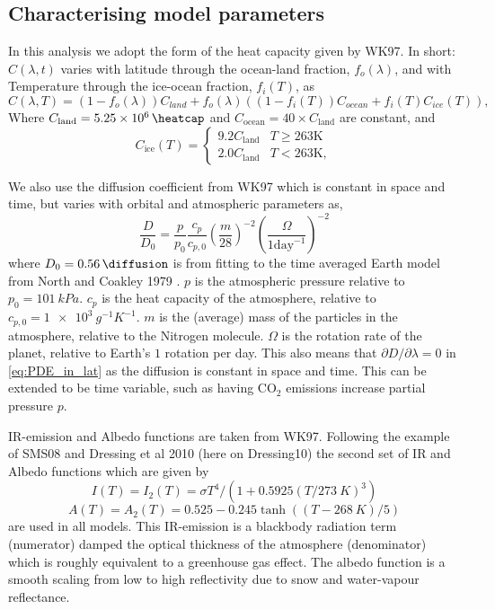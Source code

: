 \documentclass[12pt, onecolumn]{revtex4-2}    %
\begin{document}
\subsection{Characterising model parameters} \label{sec:model_params}

In this analysis we adopt the form of the heat capacity given by WK97.
In short: $C(\lambda, t)$ varies with latitude through the ocean-land fraction, $f_o(\lambda)$, and with Temperature through the ice-ocean fraction, $f_i(T)$, as
$$
    C(\lambda, T) = (1 - f_o(\lambda)) C_{land} + f_o(\lambda) ((1-f_i(T)) C_{ocean} + f_i(T) C_{ice}(T)),
$$
Where $C_{\text{land}} = \qty{5.25e6}{\heatcap}$ and $C_{\text{ocean}} = 40 \times C_{\text{land}}$ are constant, and
$$
    C_{\text{ice}}(T) =
    \begin{cases}
        9.2 C_\text{land} & T \ge 263\text{K} \\
        2.0 C_\text{land} & T < 263\text{K},
    \end{cases}
$$

We also use the diffusion coefficient from WK97 which is constant in space and time, but varies with orbital and atmospheric parameters as,
$$
    \frac{D}{D_0} = \frac{p}{p_0} \frac{c_p}{c_{p,0}} \left(\frac{m}{28}\right)^{-2} \left(\frac{\Omega}{1 \text{day}^{-1}}\right)^{-2}
$$
where $D_0 = \qty{0.56}{\diffusion}$ is from fitting to the time averaged Earth model from North and Coakley 1979 \cite{NC79}.
$p$ is the atmospheric pressure relative to $p_0 = \qty{101}{kPa}$.
$c_p$ is the heat capacity of the atmosphere, relative to $c_{p,0} = \qty{1e3}{g^{-1} K^{-1}}$.
$m$ is the (average) mass of the particles in the atmosphere, relative to the Nitrogen molecule.
$\Omega$ is the rotation rate of the planet, relative to Earth's $1$ rotation per day.
This also means that $\partial D / \partial \lambda = 0$ in \eqref{eq:PDE_in_lat} as the diffusion is constant in space and time.
This can be extended to be time variable, such as having CO$_2$ emissions increase partial pressure $p$.

IR-emission and Albedo functions are taken from WK97. Following the example of SMS08 and Dressing et al 2010 (here on Dressing10) \cite{Dressing10} the second set of IR and Albedo functions which are given by
$$
    I(T) = I_2(T) = \sigma T^4 / (1 + 0.5925 (T/\qty{273}{K}) ^ 3)
$$
$$
    A(T) = A_2(T) = 0.525 - 0.245 \tanh((T-\qty{268}{K}) / 5)
$$
are used in all models.
This IR-emission is a blackbody radiation term (numerator) damped the optical thickness of the atmosphere (denominator) which is roughly equivalent to a greenhouse gas effect.
The albedo function is a smooth scaling from low to high reflectivity due to snow and water-vapour reflectance.
\end{document}
